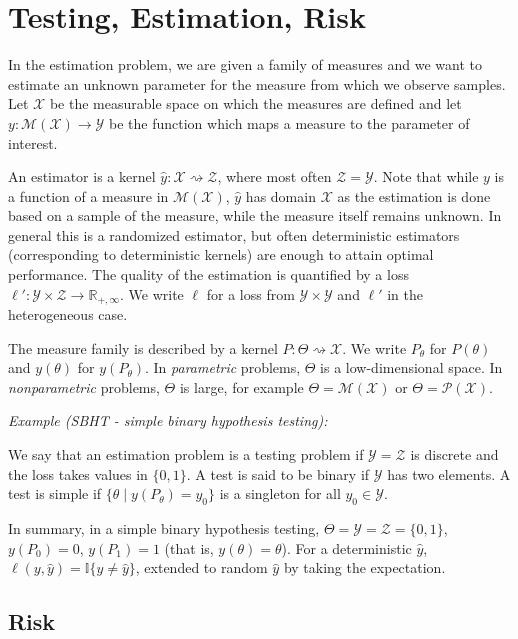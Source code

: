 \chapter{Testing, Estimation, Risk}

In the estimation problem, we are given a family of measures and we want to estimate an unknown parameter for the measure from which we observe samples.
Let $\mathcal X$ be the measurable space on which the measures are defined and let $y : \mathcal M(\mathcal X) \to \mathcal Y$ be the function which maps a measure to the parameter of interest.

An estimator is a kernel $\hat{y} : \mathcal X \rightsquigarrow \mathcal Z$, where most often $\mathcal Z = \mathcal Y$.
Note that while $y$ is a function of a measure in $\mathcal M(\mathcal X)$, $\hat{y}$ has domain $\mathcal X$ as the estimation is done based on a sample of the measure, while the measure itself remains unknown.
In general this is a randomized estimator, but often deterministic estimators (corresponding to deterministic kernels) are enough to attain optimal performance.
The quality of the estimation is quantified by a loss $\ell' : \mathcal Y \times \mathcal Z \to \mathbb{R}_{+, \infty}$. We write $\ell$ for a loss from $\mathcal Y \times \mathcal Y$ and $\ell'$ in the heterogeneous case.

The measure family is described by a kernel $P : \Theta \rightsquigarrow \mathcal X$. We write $P_\theta$ for $P(\theta)$ and $y(\theta)$ for $y(P_\theta)$.
In \emph{parametric} problems, $\Theta$ is a low-dimensional space. In \emph{nonparametric} problems, $\Theta$ is large, for example $\Theta = \mathcal M (\mathcal X)$ or $\Theta = \mathcal P(\mathcal X)$.


\emph{Example (SBHT - simple binary hypothesis testing):}

We say that an estimation problem is a testing problem if $\mathcal Y = \mathcal Z$ is discrete and the loss takes values in $\{0, 1\}$.
A test is said to be binary if $\mathcal Y$ has two elements.
A test is simple if $\{\theta \mid y(P_\theta) = y_0\}$ is a singleton for all $y_0 \in \mathcal Y$.

In summary, in a simple binary hypothesis testing, $\Theta = \mathcal Y = \mathcal Z = \{0,1\}$, $y(P_0) = 0$, $y(P_1) = 1$ (that is, $y(\theta) = \theta$). For a deterministic $\hat{y}$, $\ell(y, \hat{y}) = \mathbb{I}\{y \ne \hat{y}\}$, extended to random $\hat{y}$ by taking the expectation.

\section{Risk}

